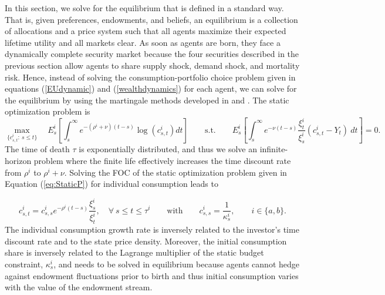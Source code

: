 \documentclass[preprint,11pt,authoryear]{elsarticle}
\theoremstyle{plain}
\begin{document}
In this section, we solve for the equilibrium that is defined in a standard way. That is, given preferences, endowments, and beliefs, an equilibrium is a collection of allocations and a price system such that all agents maximize their expected lifetime utility and all markets clear. As soon as agents are born, they face a dynamically complete security market because the four securities described in the previous section allow agents to share supply shock, demand shock, and mortality risk. Hence, instead of solving the consumption-portfolio choice problem given in equations (\ref{EUdynamic}) and (\ref{wealthdynamics}) for each agent, we can solve for the equilibrium by using the martingale methods developed in \cite{KaratzasLehoczkyShreve1987} and \cite{Cox1989}. The static optimization problem is 
\begin{equation}\label{eq:StaticP}
     \underset{\{ c^i_{s,t}: \: s \leq t  \}}{\max} \quad E^i_{s}\left[\int_{s}^{\infty}e^{-\left(\rho^i + \nu \right) \left(t-s\right)} \log\left(c^i_{s,t}\right)dt\right]  \qquad
\text{s.t.} \qquad 
E^i_{s}\left[\int_{s}^{\infty}e^{-\nu \left(t-s\right)} \frac{\xi^i_{t}}{\xi^i_{s}}   \left(c^i_{s,t}-Y_{t} \right) \: dt\right] = 0.
\end{equation}
The time of death $\tau$ is exponentially distributed, and thus we solve an infinite-horizon problem where the finite life effectively increases the time discount rate from $\rho^i$ to $\rho^i + \nu$. Solving the FOC of the static optimization problem given in Equation (\ref{eq:StaticP}) for individual consumption leads to

\begin{equation}\label{optimalconsumption}
 c^i_{s,t} =c^i_{s,s} e^{-\rho^i \left(t-s\right)} \frac{\xi^i_{s}}{\xi^i_{t}}, \quad \forall \: s \leq t \leq \tau^i \qquad \text{with} \qquad c^i_{s,s} = \frac{1}{\kappa^i_s}, \qquad  i \in \{ a,b\}.
\end{equation}
The individual consumption growth rate is inversely related to the investor's time discount rate and to the state price density. Moreover, the initial consumption share is inversely related to the Lagrange multiplier of the static budget constraint, $\kappa^i_s$, and needs to be solved in equilibrium because agents cannot hedge against endowment fluctuations prior to birth and thus initial consumption varies with the value of the endowment stream. 
 
\end{document}
